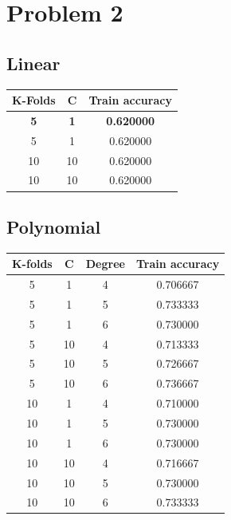 \documentclass{article}
\begin{document}
\section{Problem 2}

\subsection{Linear}

\begin{table}[htb]
\begin{tabular}{|c|c|c|}
\hline
\textbf{K-Folds} & \textbf{C}  & \textbf{Train accuracy}    \\ \hline
\rowcolor[HTML]{34FF34} 
\textbf{5}       & \textbf{1}  & \textbf{0.620000} \\ \hline
5       & 1  & 0.620000 \\ \hline
10      & 10 & 0.620000 \\ \hline
10      & 10 & 0.620000 \\ \hline
\end{tabular}
\end{table}

\subsection{Polynomial}

\begin{table}[htb]
\begin{tabular}{|c|c|c|c|}
\hline
\textbf{K-folds} & \textbf{C}  & \textbf{Degree} & \textbf{Train accuracy}    \\ \hline
5       & 1  & 4      & 0.706667 \\ \hline
5       & 1  & 5      & 0.733333 \\ \hline
5       & 1  & 6      & 0.730000 \\ \hline
5       & 10 & 4      & 0.713333 \\ \hline
5       & 10 & 5      & 0.726667 \\ \hline
\rowcolor[HTML]{34FF34}
5       & 10 & 6      & 0.736667 \\ \hline
10      & 1  & 4      & 0.710000 \\ \hline
10      & 1  & 5      & 0.730000 \\ \hline
10      & 1  & 6      & 0.730000 \\ \hline
10      & 10 & 4      & 0.716667 \\ \hline
10      & 10 & 5      & 0.730000 \\ \hline
10      & 10 & 6      & 0.733333 \\ \hline
\end{tabular}
\end{table}
\end{document}
